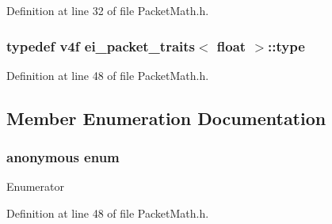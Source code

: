 Definition at line 32 of file Packet\-Math.\-h.

\hypertarget{structei__packet__traits_3_01float_01_4_ac434a034c7bdc495d5b62769f65723cf}{
\subsubsection[{type}]{\setlength{\rightskip}{0pt plus 5cm}typedef {\bf v4f} {\bf ei\-\_\-packet\-\_\-traits}$<$ {\bf float} $>$\-::{\bf type}}}\label{structei__packet__traits_3_01float_01_4_ac434a034c7bdc495d5b62769f65723cf}


Definition at line 48 of file Packet\-Math.\-h.



\subsection{Member Enumeration Documentation}
\hypertarget{structei__packet__traits_3_01float_01_4_af21a597c6c1f031fecec2855f14ff5fa}{\subsubsection[{anonymous enum}]{\setlength{\rightskip}{0pt plus 5cm}anonymous enum}}\label{structei__packet__traits_3_01float_01_4_af21a597c6c1f031fecec2855f14ff5fa}
\begin{Desc}
\item[Enumerator]\par
\begin{description}
\item[{\em 
\hypertarget{structei__packet__traits_3_01float_01_4_a1ddb0f3d8f49102d406f6448e72156b3ac1adc8ee30145fa8d745c6c2d6b3bbba}{size}\label{structei__packet__traits_3_01float_01_4_a1ddb0f3d8f49102d406f6448e72156b3ac1adc8ee30145fa8d745c6c2d6b3bbba}
}]\end{description}
\end{Desc}


Definition at line 48 of file Packet\-Math.\-h.

